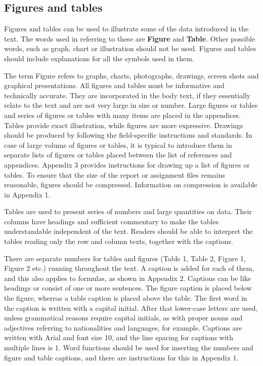 \documentclass[12pt]{article}
\begin{document}
\subsection{Figures and tables}
Figures and tables can be used to illustrate some of the data introduced in the text. The words used in referring to these are \textbf{Figure} and \textbf{Table}. Other possible words, such as graph, chart or illustration should not be used. Figures and tables should include explanations for all the symbols used in them.

The term Figure refers to graphs, charts, photographs, drawings, screen shots and graphical presentations. All figures and tables must be informative and technically accurate. They are incorporated in the body text, if they essentially relate to the text and are not very large in size or number. Large figures or tables and series of figures or tables with many items are placed in the appendices. Tables provide exact illustration, while figures are more expressive. Drawings should be produced by following the field-specific instructions and standards. In case of large volume of figures or tables, it is typical to introduce them in separate lists of figures or tables placed between the list of references and appendices. Appendix 3 provides instructions for drawing up a list of figures or tables. To ensure that the size of the report or assignment files remains reasonable, figures should be compressed. Information on compression is available in Appendix 1. 

Tables are used to present series of numbers and large quantities on data. Their columns have headings and sufficient commentary to make the tables understandable independent of the text. Readers should be able to interpret the tables reading only the row and column texts, together with the captions.

There are separate numbers for tables and figures (Table 1, Table 2, Figure 1, Figure 2 etc.) running throughout the text. A caption is added for each of them, and this also applies to formulas, as shown in Appendix 2. Captions can be like headings or consist of one or more sentences. The figure caption is placed below the figure, whereas a table caption is placed above the table. The first word in the caption is written with a capital initial. After that lower-case letters are used, unless grammatical reasons require capital initials, as with proper nouns and adjectives referring to nationalities and languages, for example. Captions are written with Arial and font size 10, and the line spacing for captions with multiple lines is 1. Word functions should be used for inserting the numbers and figure and table captions, and there are instructions for this in Appendix 1.
\end{document}
